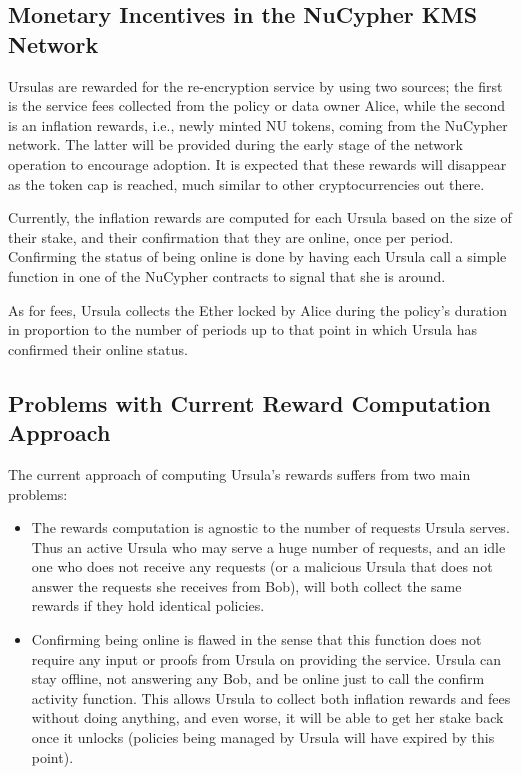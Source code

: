 \subsection{Monetary Incentives in the NuCypher KMS Network}
Ursulas are rewarded for the re-encryption service by using two sources; 
the first is the service fees collected from the policy or data 
owner Alice, while the second is an inflation rewards, i.e., newly minted 
NU tokens, coming from the NuCypher network. The latter will be provided during the 
early stage of the network operation to encourage 
adoption. It is expected that these rewards will disappear as the token cap is 
reached, much similar to other cryptocurrencies out there.


Currently, the inflation rewards are computed for each Ursula based on the size of their stake, and their confirmation that they are online, once per period. Confirming the status of being online is done by having each Ursula call a 
simple function in one of the NuCypher contracts to signal that she is around. 

As for fees, Ursula collects the Ether locked by Alice during the policy's duration in proportion to the number of periods up to that point in which Ursula has confirmed their online status. 


\subsection{Problems with Current Reward Computation Approach}
The current approach of computing Ursula's rewards suffers from two 
main problems: 
\begin{itemize}
\setlength{\itemsep}{0pt}
\item The rewards computation is agnostic to the number of 
requests Ursula serves. Thus an active Ursula who may serve a huge number of 
requests, and an idle one who does not receive any requests (or a 
malicious Ursula that does not answer the requests she receives from Bob), will 
both collect the same rewards if they hold identical policies.

\item Confirming being online is flawed in the sense that this function does 
not require any input or proofs from Ursula on providing the service. Ursula 
can stay offline, not answering any Bob, and be online just to call the confirm activity 
function. This allows Ursula to collect both inflation rewards 
and fees without doing anything, and even worse, it will be able to get her stake back once it unlocks (policies being managed by Ursula will have expired by this point). 
\end{itemize}


